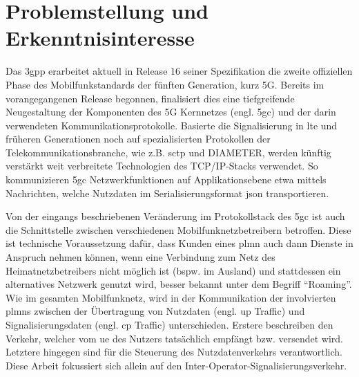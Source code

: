 \section{Problemstellung und Erkenntnisinteresse}

Das \gls{3gpp} erarbeitet aktuell in Release 16 seiner Spezifikation die zweite offiziellen Phase des Mobilfunkstandards der fünften Generation, kurz 5G.
Bereits im vorangegangenen Release begonnen, finalisiert dies eine tiefgreifende Neugestaltung der Komponenten des 5G Kernnetzes (engl. \gls{5gc}) und der darin verwendeten Kommunikationsprotokolle.
Basierte die Signalisierung in \gls{lte} und früheren Generationen noch auf spezialisierten Protokollen der Telekommunikationsbranche, wie z.B. \gls{sctp} und DIAMETER, werden künftig verstärkt weit verbreitete Technologien des TCP/IP-Stacks verwendet.
So kommunizieren \gls{5gc} Netzwerkfunktionen auf Applikationsebene etwa mittels  Nachrichten, welche Nutzdaten im Serialisierungsformat \gls{json} transportieren.

Von der eingangs beschriebenen Veränderung im Protokollstack des \gls{5gc} ist auch die Schnittstelle zwischen verschiedenen Mobilfunknetzbetreibern betroffen.
Diese ist technische Voraussetzung dafür, dass Kunden eines \gls{plmn} auch dann Dienste in Anspruch nehmen können, wenn eine Verbindung zum Netz des Heimatnetzbetreibers nicht möglich ist (bspw. im Ausland) und stattdessen ein alternatives Netzwerk genutzt wird, besser bekannt unter dem Begriff ``Roaming''.
Wie im gesamten Mobilfunknetz, wird in der Kommunikation der involvierten \glspl{plmn} zwischen der Übertragung von Nutzdaten (engl. \gls{up} Traffic) und Signalisierungsdaten (engl. \gls{cp} Traffic) unterschieden.
Erstere beschreiben den Verkehr, welcher vom \gls{ue} des Nutzers tatsächlich empfängt bzw. versendet wird.
Letztere hingegen sind für die Steuerung des Nutzdatenverkehrs verantwortlich.
Diese Arbeit fokussiert sich allein auf den Inter-Operator-Signalisierungsverkehr.

